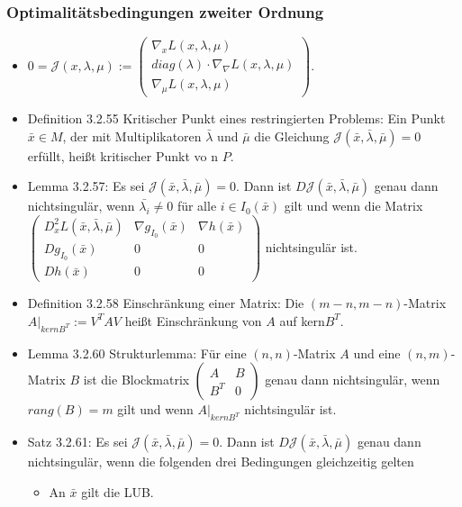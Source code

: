 \documentclass[paper=a4, fontsize=11pt]{scrartcl} %
\numberwithin{equation}{section} %
\numberwithin{figure}{section} %
\numberwithin{table}{section} %
\begin{document}
\subsubsection{Optimalitätsbedingungen zweiter Ordnung}

\begin{itemize}
  \item $ 0 = \mathcal{J}(x,\lambda,\mu) := \begin{pmatrix} \nabla_x L(x,\lambda,\mu) \\ diag(\lambda) \cdot \nabla_\nabla L(x,\lambda,\mu) \\ \nabla_\mu L(x,\lambda,\mu)\end{pmatrix}$.
  \item Definition 3.2.55 Kritischer Punkt eines restringierten Problems: Ein Punkt $\bar{x} \in M$, der mit Multiplikatoren $\bar{\lambda}$ und $\bar{\mu}$ die Gleichung $\mathcal{J}(\bar{x},\bar{\lambda},\bar{\mu}) = 0$ erfüllt, heißt kritischer Punkt vo n $P$.
  \item Lemma 3.2.57: Es sei $\mathcal{J}(\bar{x},\bar{\lambda},\bar{\mu}) = 0$. Dann ist $D\mathcal{J}(\bar{x},\bar{\lambda},\bar{\mu})$ genau dann nichtsingulär, wenn $\bar{\lambda_i} \neq 0$ für alle $i \in I_0(\bar{x})$ gilt und wenn die Matrix $\begin{pmatrix} D^2_x L(\bar{x},\bar{\lambda},\bar{\mu}) & \nabla g_{I_0}(\bar{x}) & \nabla h(\bar{x}) \\ Dg_{I_0}(\bar{x}) & 0 & 0 \\ Dh(\bar{x}) & 0 & 0\end{pmatrix}$ nichtsingulär ist.
  \item Definition 3.2.58 Einschränkung einer Matrix: Die $(m-n,m-n)$-Matrix $A|_{kernB^T} := V^TAV$ heißt Einschränkung von $A$ auf kern$B^T$.
  \item Lemma 3.2.60 Strukturlemma: Für eine $(n,n)$-Matrix $A$ und eine $(n,m)$-Matrix $B$ ist die Blockmatrix $\begin{pmatrix}A & B \\ B^T & 0\end{pmatrix}$ genau dann nichtsingulär, wenn $rang(B) = m$ gilt und wenn $A|_{kernB^T}$ nichtsingulär ist.
  \item Satz 3.2.61: Es sei $\mathcal{J}(\bar{x},\bar{\lambda},\bar{\mu}) = 0$. Dann ist $D \mathcal{J}(\bar{x},\bar{\lambda},\bar{\mu})$ genau dann nichtsingulär, wenn die folgenden drei Bedingungen gleichzeitig gelten
  \begin{itemize}
    \item An $\bar{x}$ gilt die LUB.

\end{itemize}
\end{itemize}
\end{document}
